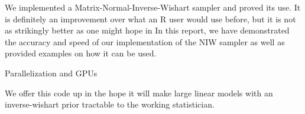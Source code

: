 \documentclass[english]{report}
\begin{document}


We implemented a Matrix-Normal-Inverse-Wishart sampler and proved its use. It is definitely an improvement over what an R user would use before, but it is not as strikingly better as one might hope in 
In this report, we have demonstrated the accuracy and speed of our implementation of the NIW sampler as well as provided examples on how it can be used. 

Parallelization and GPUs 


We offer this code \cite{MNIW} up in the hope it will make large linear models with an inverse-wishart prior tractable to the working statistician.
\end{document}
